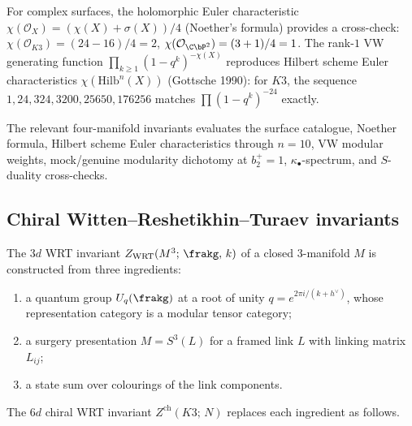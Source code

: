 \begin{remark}
\label{rem:four-manifold-noether-hilb}
For complex surfaces, the holomorphic Euler characteristic
$\chi(\mathcal{O}_X) = (\chi(X) + \sigma(X))/4$ (Noether's formula)
provides a cross-check: $\chi(\mathcal{O}_{K3}) = (24 - 16)/4 = 2$,
$\chi(\mathcal{O}_{\C\bP^2}) = (3 + 1)/4 = 1$. The rank-$1$ VW
generating function $\prod_{k \geq 1} (1 - q^k)^{-\chi(X)}$ reproduces
Hilbert scheme Euler characteristics $\chi(\mathrm{Hilb}^n(X))$
(Gottsche 1990): for $K3$, the sequence $1, 24, 324, 3200, 25650,
176256$ matches $\prod(1 - q^k)^{-24}$ exactly.

\noindent The relevant four-manifold invariants
evaluates the surface catalogue, Noether formula, Hilbert scheme Euler
characteristics through $n = 10$, VW modular weights, mock/genuine
modularity dichotomy at $b_2^+ = 1$, $\kappa_\bullet$-spectrum, and
$S$-duality cross-checks.
\end{remark}


\subsection{Chiral Witten--Reshetikhin--Turaev invariants}
\label{subsec:chiral-wrt}

The $3d$ WRT invariant $Z_{\mathrm{WRT}}(M^3;\, \frakg,\, k)$ of a closed $3$-manifold $M$ is constructed from three ingredients:
\begin{enumerate}[label=\textup{(\roman*)}]
 \item a quantum group $U_q(\frakg)$ at a root of unity $q = e^{2\pi i/(k + h^\vee)}$, whose representation category is a modular tensor category;
 \item a surgery presentation $M = S^3(L)$ for a framed link $L$ with linking matrix $L_{ij}$;
 \item a state sum over colourings of the link components.
\end{enumerate}
The $6d$ chiral WRT invariant $Z^{\mathrm{ch}}(K3;\, N)$ replaces each ingredient as follows.

